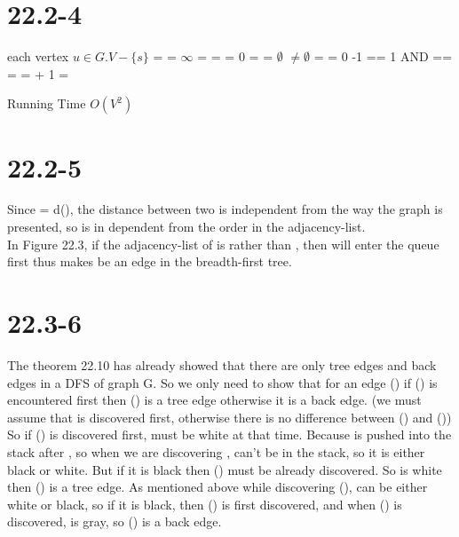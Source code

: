 \documentclass[a4paper]{article}
\begin{document}
\section*{22.2-4}
\begin{codebox}
\li \For each vertex $u \in G.V - \{s\}$
\li \Do {} = 
\li {} = $\infty$
\li {} =  \End
\li {} = 
\li {} = 0
\li {} = 
\li {} = $\emptyset$
\li {}
\li \While {} $\not=\emptyset$
\li \Do {} = 
\li \For {} = 0 \To {}-1
\li     \Do \If {} == 1 AND  == 
\li             \Do {} = 
\li             {} =  + 1
\li             {} = 
\li             {} \End\End\End
\end{codebox}
Running Time $O(V^2)$
\section*{22.2-5}
Since  = d(), the distance between two  is independent from the way the graph is presented, so  is in dependent from the order in the adjacency-list.\\
 In Figure 22.3, if the adjacency-list of  is  rather than , then  will enter the queue first thus makes  be an edge in the breadth-first tree.
 \section*{22.3-6}
 The theorem 22.10 has already showed that there are only tree edges and back edges in a DFS of graph G. So we only need to show that for an edge () if () is encountered first then () is a tree edge otherwise it is a back edge.  (we must assume that  is discovered first, otherwise there is no difference between () and ()) So if () is discovered first,  must be white at that time. Because  is pushed into the stack after , so when we are discovering ,  can't be in the stack, so it is either black or white. But if it is black then () must be already discovered. So  is white then ()  is a tree edge. As mentioned above while discovering (),  can be either white or black, so if it is black, then () is first discovered, and when () is discovered,  is gray, so () is a back edge.
\end{document}
